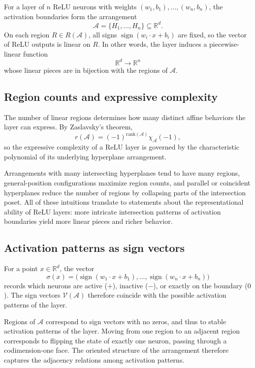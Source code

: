 \documentclass[12pt]{amsart}
\theoremstyle{plain}
\theoremstyle{definition}
\theoremstyle{remark}
\newcommand{\R}{\mathbb{R}}
\newcommand{\A}{\mathcal{A}}
\newcommand{\V}{\mathcal{V}}
\begin{document}
For a layer of $n$ ReLU neurons with weights $(w_1,b_1),\dots,(w_n,b_n)$, the activation boundaries form the arrangement
\[
\A = \{H_1,\dots,H_n\} \subseteq \R^d.
\]
On each region $R \in R(\A)$, all signs $\operatorname{sign}(w_i \cdot x + b_i)$ are fixed, so the vector of ReLU outputs is linear on $R$. In other words, the layer induces a piecewise-linear function
\[
\R^d \to \R^n
\]
whose linear pieces are in bijection with the regions of $\A$.

\subsection{Region counts and expressive complexity}
The number of linear regions determines how many distinct affine behaviors the layer can express. By Zaslavsky's theorem,
\[
r(\A) = (-1)^{\mathrm{rank}(\A)} \chi_{\A}(-1),
\]
so the expressive complexity of a ReLU layer is governed by the characteristic polynomial of its underlying hyperplane arrangement.

Arrangements with many intersecting hyperplanes tend to have many regions, general-position configurations maximize region counts, and parallel or coincident hyperplanes reduce the number of regions by collapsing parts of the intersection poset. All of these intuitions translate to statements about the representational ability of ReLU layers: more intricate intersection patterns of activation boundaries yield more linear pieces and richer behavior.

\subsection{Activation patterns as sign vectors}
For a point $x \in \R^d$, the vector
\[
\sigma(x) = \bigl( \operatorname{sign}(w_1 \cdot x + b_1), \dots, \operatorname{sign}(w_n \cdot x + b_n) \bigr)
\]
records which neurons are active ($+$), inactive ($-$), or exactly on the boundary ($0$). The sign vectors $\V(\A)$ therefore coincide with the possible activation patterns of the layer.

Regions of $\A$ correspond to sign vectors with no zeros, and thus to stable activation patterns of the layer. Moving from one region to an adjacent region corresponds to flipping the state of exactly one neuron, passing through a codimension-one face. The oriented structure of the arrangement therefore captures the adjacency relations among activation patterns.
\end{document}
